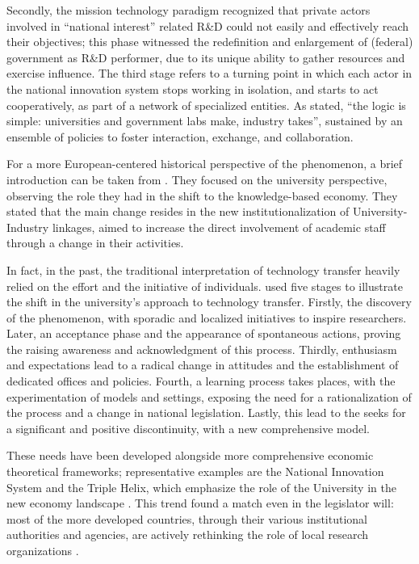 Secondly, the mission technology paradigm recognized that private actors involved in \enquote{national interest} related R\&D could not easily and effectively reach their objectives; this phase witnessed the redefinition and enlargement of (federal) government as R\&D performer, due to its unique ability to gather resources and exercise influence. The third stage refers to a turning point in which each actor in the national innovation system stops working in isolation, and starts to act cooperatively, as part of a network of specialized entities. As stated, \enquote{the logic is simple: universities and government labs make, industry takes}, sustained by an ensemble of policies to foster interaction, exchange, and collaboration. 

For a more European-centered historical perspective of the phenomenon, a brief introduction can be taken from \citet{Geuna2009}. They focused on the university perspective, observing the role they had in the shift to the knowledge-based economy. They stated that the main change resides in the new institutionalization of University-Industry linkages, aimed to increase the direct involvement of academic staff through a change in their activities.

In fact, in the past, the traditional interpretation of technology transfer heavily relied on the effort and the initiative of individuals. \citet{Balderi2007} used five stages to illustrate the shift in the university's approach to technology transfer. Firstly, the discovery of the phenomenon, with sporadic and localized initiatives to inspire researchers. Later, an acceptance phase and the appearance of spontaneous actions, proving the raising awareness and acknowledgment of this process. Thirdly, enthusiasm and expectations lead to a radical change in attitudes and the establishment of dedicated offices and policies. Fourth, a learning process takes places, with the experimentation of models and settings, exposing the need for a rationalization of the process and a change in national legislation. Lastly, this lead to the seeks for a significant and positive discontinuity, with a new comprehensive model.

These needs have been developed alongside more comprehensive economic theoretical frameworks; representative examples are the National Innovation System and the Triple Helix, which emphasize the role of the University in the new economy landscape \citep{Balderi2007}. This trend found a match even in the legislator will: most of the more developed countries, through their various institutional authorities and agencies, are actively rethinking the role of local research organizations \citep{Geuna2009}.

